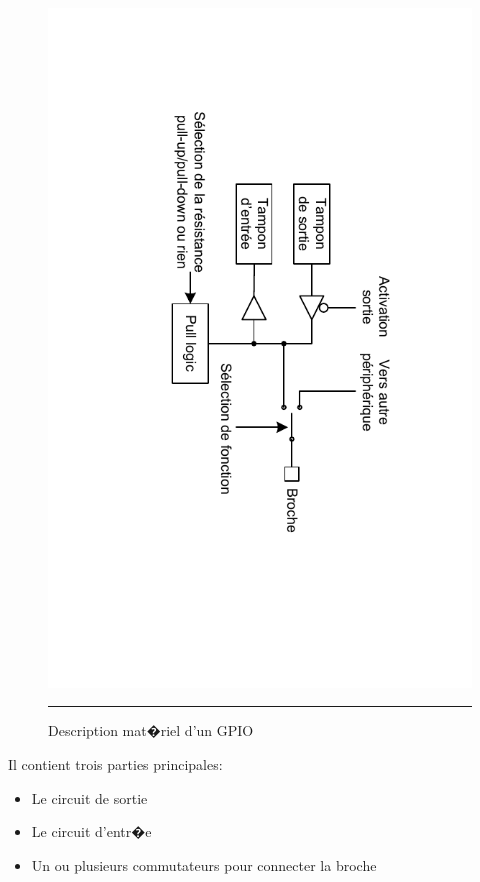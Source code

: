 \begin{figure}[htb]
  \centering
  \includegraphics[angle=90, trim = 25mm 0mm 15mm 0mm, clip, width=14cm]{./Figures/gpio/Port.pdf}
  \rule{35em}{0.5pt}
  \caption[port GPIO]{Description mat�riel d'un GPIO}
  \label{fig:gpio}
\end{figure}

Il contient trois parties principales:
\begin{itemize}[label=\textbullet,font=\small]
\item Le circuit de sortie
\item Le circuit d'entr�e
\item Un ou plusieurs commutateurs pour connecter la broche
\end{itemize}

